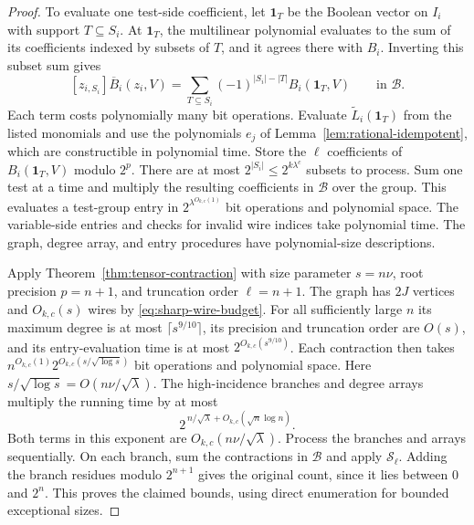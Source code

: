\begin{proof}
To evaluate one test-side coefficient, let $\mathbf1_T$ be the
Boolean vector on $I_i$ with support $T\subseteq S_i$. At
$\mathbf1_T$, the multilinear polynomial evaluates to the sum of its
coefficients indexed by subsets of $T$, and it agrees there with
$B_i$. Inverting this subset sum gives
\[
 [z_{i,S_i}]\overline B_i(z_i,V)=
 \sum_{T\subseteq S_i}(-1)^{|S_i|-|T|}B_i(\mathbf1_T,V)
 \qquad\text{in }\mathcal B.
\]
Each term costs polynomially many bit operations. Evaluate
$\widetilde L_i(\mathbf1_T)$ from the listed monomials and use the
polynomials $e_j$ of Lemma~\ref{lem:rational-idempotent}, which
are constructible in polynomial time. Store the $\ell$ coefficients
of $B_i(\mathbf1_T,V)$ modulo $2^p$. There are at most
$2^{|S_i|}\le 2^{k\lambda^c}$ subsets to process. Sum one test
at a time and multiply the resulting coefficients in $\mathcal B$
over the group. This evaluates a test-group entry in
$2^{\lambda^{O_{k,c}(1)}}$ bit operations and polynomial space.
The variable-side entries and checks for invalid wire indices take
polynomial time. The graph, degree array, and entry procedures have
polynomial-size descriptions.

Apply Theorem~\ref{thm:tensor-contraction} with size parameter
$s=n\nu$, root precision $p=n+1$, and truncation order $\ell=n+1$.
The graph has $2J$ vertices and $O_{k,c}(s)$ wires by
\eqref{eq:sharp-wire-budget}. For all sufficiently large $n$ its
maximum degree is at most $\lceil s^{9/10}\rceil$, its precision
and truncation order are $O(s)$, and its entry-evaluation time is
at most $2^{O_{k,c}(s^{9/10})}$. Each contraction then takes
$n^{O_{k,c}(1)}2^{O_{k,c}(s/\sqrt{\log s})}$ bit operations and
polynomial space. Here $s/\sqrt{\log s}=O(n\nu/\sqrt\lambda)$.
The high-incidence branches and degree arrays multiply the
running time by at most
\[
 2^{\,n/\sqrt{\lambda}+O_{k,c}(\sqrt n\log n)}.
\]
Both terms in this exponent are $O_{k,c}(n\nu/\sqrt{\lambda})$.
Process the branches and arrays sequentially. On each branch,
sum the contractions in $\mathcal B$ and apply $\mathcal S_\ell$.
Adding the branch residues modulo $2^{n+1}$ gives the original
count, since it lies between $0$ and $2^n$. This proves the
claimed bounds, using direct enumeration for bounded exceptional
sizes.
\end{proof}

